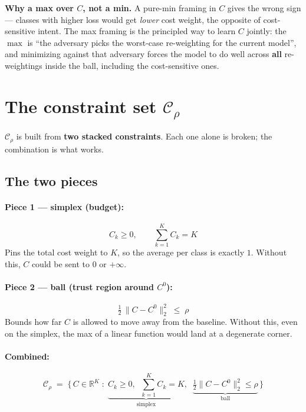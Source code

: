 \documentclass[11pt,a4paper]{article}
\begin{document}
\textbf{Why a max over $C$, not a min.} A pure-min framing in $C$ gives the wrong sign --- classes with higher loss would get \emph{lower} cost weight, the opposite of cost-sensitive intent. The max framing is the principled way to learn $C$ jointly: the $\max$ is ``the adversary picks the worst-case re-weighting for the current model'', and minimizing against that adversary forces the model to do well across \textbf{all} re-weightings inside the ball, including the cost-sensitive ones.

\section{The constraint set $\mathcal{C}_\rho$}

$\mathcal{C}_\rho$ is built from \textbf{two stacked constraints}. Each one alone is broken; the combination is what works.

\subsection{The two pieces}

\paragraph{Piece 1 --- simplex (budget):}
\[
C_k \geq 0,\qquad \sum_{k=1}^{K} C_k = K
\]
Pins the total cost weight to $K$, so the average per class is exactly $1$. Without this, $C$ could be sent to $0$ or $+\infty$.

\paragraph{Piece 2 --- ball (trust region around $C^0$):}
\[
\tfrac{1}{2}\,\|C - C^{0}\|_{2}^{2}\;\leq\;\rho
\]
Bounds how far $C$ is allowed to move away from the baseline. Without this, even on the simplex, the max of a linear function would land at a degenerate corner.

\paragraph{Combined:}
\begin{equation}
\boxed{\;\mathcal{C}_\rho \;=\; \Big\{\,C \in \mathbb{R}^{K} \;:\; \underbrace{C_k \geq 0,\;\;\textstyle\sum_{k=1}^{K} C_k = K}_{\text{simplex}},\;\;\underbrace{\tfrac{1}{2}\|C - C^{0}\|_{2}^{2} \leq \rho}_{\text{ball}}\,\Big\}\;}
\end{equation}
\end{document}
